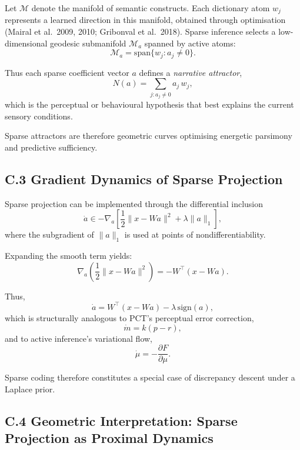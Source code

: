 \documentclass[11pt,a4paper,twoside]{article}
\begin{document}
Let $\mathcal{M}$ denote the manifold of semantic constructs. Each dictionary atom $w_j$ represents a learned direction in this manifold, obtained through optimisation (Mairal et al.\ 2009, 2010; Gribonval et al.\ 2018). Sparse inference selects a low-dimensional geodesic submanifold $\mathcal{M}_a$ spanned by active atoms:
\[
\mathcal{M}_a = \mathrm{span}\{ w_j : a_j \neq 0 \}.
\]

Thus each sparse coefficient vector $a$ defines a \emph{narrative attractor},
\[
N(a) = \sum_{j : a_j \neq 0} a_j \, w_j,
\]
which is the perceptual or behavioural hypothesis that best explains the current sensory conditions.

\begin{center}
\end{center}

Sparse attractors are therefore geometric curves optimising energetic parsimony and predictive sufficiency.

\subsection*{C.3 Gradient Dynamics of Sparse Projection}

Sparse projection can be implemented through the differential inclusion
\[
\dot{a} \in -\nabla_a \left[ \frac{1}{2}\|x - Wa\|^2 + \lambda \|a\|_1 \right],
\]
where the subgradient of $\|a\|_1$ is used at points of nondifferentiability.

Expanding the smooth term yields:
\[
\nabla_a \left( \frac{1}{2}\|x - Wa\|^2 \right)
= -W^\top (x - Wa).
\]

Thus,
\[
\dot{a} = W^\top (x - Wa) - \lambda \,\mathrm{sign}(a),
\]
which is structurally analogous to PCT’s perceptual error correction,
\[
\dot{m} = k (p - r),
\]
and to active inference’s variational flow,
\[
\dot{\mu} = -\frac{\partial F}{\partial \mu}.
\]

Sparse coding therefore constitutes a special case of discrepancy descent under a Laplace prior.

\subsection*{C.4 Geometric Interpretation: Sparse Projection as Proximal Dynamics}
\end{document}
